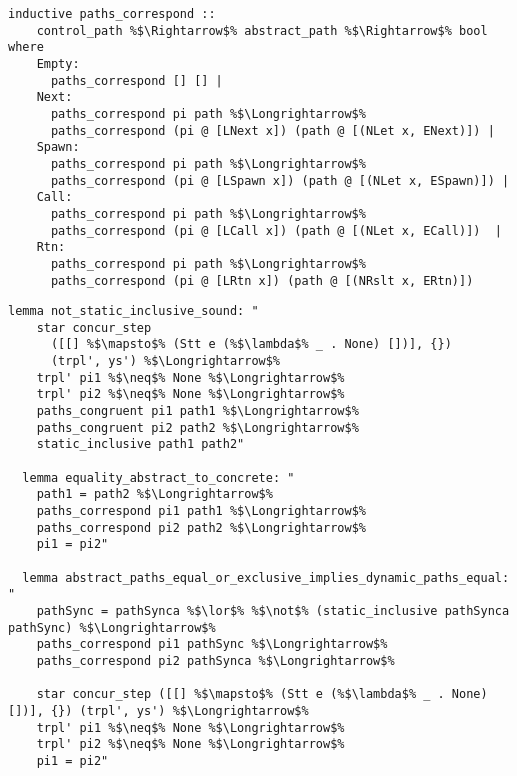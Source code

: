 \documentclass{article}
\begin{document}
\begin{lstlisting}[style=codestyle1, escapechar=\%]
  inductive paths_correspond ::
    control_path %$\Rightarrow$% abstract_path %$\Rightarrow$% bool where
    Empty:
      paths_correspond [] [] |
    Next:
      paths_correspond pi path %$\Longrightarrow$%
      paths_correspond (pi @ [LNext x]) (path @ [(NLet x, ENext)]) |
    Spawn:
      paths_correspond pi path %$\Longrightarrow$%
      paths_correspond (pi @ [LSpawn x]) (path @ [(NLet x, ESpawn)]) |
    Call:
      paths_correspond pi path %$\Longrightarrow$%
      paths_correspond (pi @ [LCall x]) (path @ [(NLet x, ECall)])  |
    Rtn:
      paths_correspond pi path %$\Longrightarrow$%
      paths_correspond (pi @ [LRtn x]) (path @ [(NRslt x, ERtn)]) 
  \end{lstlisting}

\begin{lstlisting}[style=codestyle1, escapechar=\%]
  lemma not_static_inclusive_sound: "
    star concur_step
      ([[] %$\mapsto$% (Stt e (%$\lambda$% _ . None) [])], {})
      (trpl', ys') %$\Longrightarrow$% 
    trpl' pi1 %$\neq$% None %$\Longrightarrow$% 
    trpl' pi2 %$\neq$% None %$\Longrightarrow$% 
    paths_congruent pi1 path1 %$\Longrightarrow$%
    paths_congruent pi2 path2 %$\Longrightarrow$%
    static_inclusive path1 path2"

  lemma equality_abstract_to_concrete: "
    path1 = path2 %$\Longrightarrow$%
    paths_correspond pi1 path1 %$\Longrightarrow$%
    paths_correspond pi2 path2 %$\Longrightarrow$%
    pi1 = pi2"

  lemma abstract_paths_equal_or_exclusive_implies_dynamic_paths_equal: "
    pathSync = pathSynca %$\lor$% %$\not$% (static_inclusive pathSynca pathSync) %$\Longrightarrow$% 
    paths_correspond pi1 pathSync %$\Longrightarrow$%
    paths_correspond pi2 pathSynca %$\Longrightarrow$%

    star concur_step ([[] %$\mapsto$% (Stt e (%$\lambda$% _ . None) [])], {}) (trpl', ys') %$\Longrightarrow$%
    trpl' pi1 %$\neq$% None %$\Longrightarrow$% 
    trpl' pi2 %$\neq$% None %$\Longrightarrow$% 
    pi1 = pi2"


  \end{lstlisting}
\end{document}
